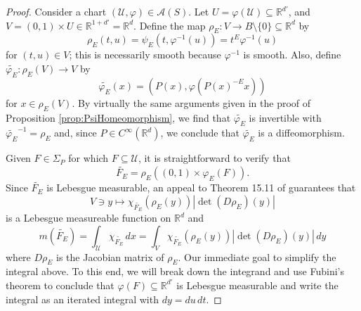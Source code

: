 \documentclass[11pt]{article}
\renewcommand\det{\operatorname{det}}
\newcommand\R{\mathbb{R}}
\begin{document}
\begin{proof}

Consider a chart $(\mathcal{U},\varphi) \in \mathcal{A}(S)$. Let $U = \varphi(\mathcal{U}) \subseteq \R^{d'}$, and $V = (0, 1) \times U\in \mathbb{R}^{1+d'}=\mathbb{R}^d$. Define the map $\rho_E : V \to B\setminus \{ 0 \}\subseteq \mathbb{R}^d$ by 
\begin{equation*}
    \rho_{E} (t,u) = \psi_E(t,\varphi^{-1}(u)) = t^E \varphi^{-1}(u)
\end{equation*}
for $(t,u)\in V$; this is necessarily smooth because $\varphi^{-1}$ is smooth. Also, define $\widetilde{\varphi_E}:\rho_E(V) \to V$ by
\begin{equation*}
    \widetilde{\varphi_E}(x) = (P(x), \varphi(P(x)^{-E} x))
\end{equation*}
for $x\in\rho_E(V)$. By virtually the same arguments given in the proof of Proposition \ref{prop:PsiHomeomorphism}, we find that $\widetilde{\varphi_E}$ is invertible with $\widetilde{\varphi_E}^{-1}=\rho_E$ and, since $P\in C^\infty(\mathbb{R}^d)$, we conclude that $\widetilde{\varphi_E}$ is a diffeomorphism. 

Given $F\in\Sigma_P$ for which $F\subseteq\mathcal{U}$, it is straightforward to verify that
\begin{equation*}
    \widetilde{F_E}=\rho_E\left((0,1)\times\varphi_E(F)\right).
\end{equation*}
Since $\widetilde{F_E}$ is Lebesgue measurable, an appeal to Theorem 15.11 of \cite{Apostol1974} guarantees that
\begin{equation}\label{eq:RiemannLebesgue1}
    V\ni y\mapsto \chi_{\widetilde{F_E}}(\rho_E(y))|\det(D\rho_E)(y)|
\end{equation}
is a Lebesgue measureable function on $\mathbb{R}^d$ and
\begin{equation*}
    m(\widetilde{F_E})=\int_{\mathcal{U}}\chi_{\widetilde{F_E}}\,dx=\int_{V}\chi_{\widetilde{F_E}}(\rho_E(y))|\det(D\rho_E)(y)|\,dy
\end{equation*}
where $D\rho_E$ is the Jacobian matrix of $\rho_E$. Our immediate goal to simplify the integral above. To this end, we will break down the integrand and use Fubini's theorem to conclude that $\varphi(F)\subseteq \mathbb{R}^{d'}$ is Lebesgue measurable and write the integral as an iterated integral with $dy=du\,dt$.


\end{proof}
\end{document}
